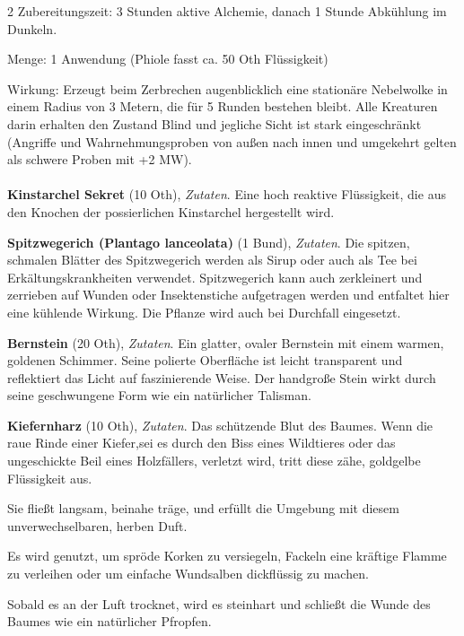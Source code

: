 \begin{multicols}{2}
Zubereitungszeit:
3 Stunden aktive Alchemie, danach 1 Stunde Abkühlung im Dunkeln.

Menge:
1 Anwendung (Phiole fasst ca. 50 Oth Flüssigkeit)

Wirkung:
Erzeugt beim Zerbrechen augenblicklich eine stationäre Nebelwolke in einem Radius von 3 Metern, die für 5 Runden bestehen bleibt. Alle Kreaturen darin erhalten den Zustand Blind und jegliche Sicht ist stark eingeschränkt (Angriffe und Wahrnehmungsproben von außen nach innen und umgekehrt gelten als schwere Proben mit +2 MW).

    \paragraph{}
    \begin{denseitemize}
        \item \textbf{Kinstarchel Sekret} (10 Oth), \textit{Zutaten}.
        Eine hoch reaktive Flüssigkeit, die aus den Knochen der possierlichen Kinstarchel hergestellt wird.
        \item \textbf{Spitzwegerich (Plantago lanceolata)} (1 Bund), \textit{Zutaten}.
        Die spitzen, schmalen Blätter des Spitzwegerich werden als Sirup oder auch als Tee bei Erkältungskrankheiten verwendet. Spitzwegerich kann auch zerkleinert und zerrieben auf Wunden oder Insektenstiche aufgetragen werden und entfaltet hier eine kühlende Wirkung. Die Pflanze wird auch bei Durchfall eingesetzt.
        \item \textbf{Bernstein} (20 Oth), \textit{Zutaten}.
        Ein glatter, ovaler Bernstein mit einem warmen, goldenen Schimmer. Seine polierte Oberfläche ist leicht transparent und reflektiert das Licht auf faszinierende Weise. Der handgroße Stein wirkt durch seine geschwungene Form wie ein natürlicher Talisman.
        \item \textbf{Kiefernharz} (10 Oth), \textit{Zutaten}.
        Das schützende Blut des Baumes. Wenn die raue Rinde einer Kiefer,sei es durch den Biss eines Wildtieres oder das ungeschickte Beil eines Holzfällers, verletzt wird, tritt diese zähe, goldgelbe Flüssigkeit aus.

Sie fließt langsam, beinahe träge, und erfüllt die Umgebung mit diesem unverwechselbaren, herben Duft.

Es wird genutzt, um spröde Korken zu versiegeln, Fackeln eine kräftige Flamme zu verleihen oder um einfache Wundsalben dickflüssig zu machen.

Sobald es an der Luft trocknet, wird es steinhart und schließt die Wunde des Baumes wie ein natürlicher Pfropfen. 


\end{denseitemize}
\end{multicols}
